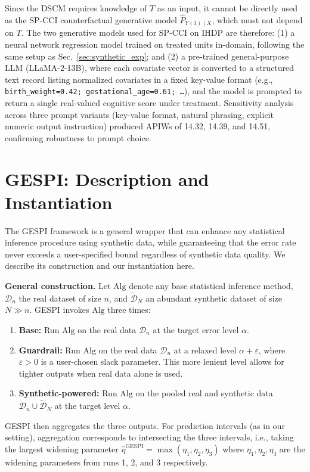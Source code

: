 \documentclass{article}
\theoremstyle{plain}
\theoremstyle{definition}
\theoremstyle{remark}
\begin{document}
Since the DSCM requires knowledge of $T$ as an input, it cannot be directly used as the SP-CCI counterfactual generative model $\hat{P}_{Y(1)\mid X}$, which must not depend on $T$. The two generative models used for SP-CCI on IHDP are therefore: (1) a neural network regression model trained on treated units in-domain, following the same setup as Sec.~\ref{sec:synthetic_exp}; and (2) a pre-trained general-purpose LLM (LLaMA-2-13B), where each covariate vector is converted to a structured text record listing normalized covariates in a fixed key-value format (e.g., \texttt{birth\_weight=0.42; gestational\_age=0.61; \ldots}), and the model is prompted to return a single real-valued cognitive score under treatment. Sensitivity analysis across three prompt variants (key-value format, natural phrasing, explicit numeric output instruction) produced APIWs of 14.32, 14.39, and 14.51, confirming robustness to prompt choice.


\section{GESPI: Description and Instantiation}
\label{appendix:gespi}

The GESPI framework \citep{bashari2026statistical} is a general wrapper that can enhance any statistical inference procedure using synthetic data, while guaranteeing that the error rate never exceeds a user-specified bound regardless of synthetic data quality. We describe its construction and our instantiation here.

\textbf{General construction.} Let $\mathrm{Alg}$ denote any base statistical inference method, $\mathcal{D}_n$ the real dataset of size $n$, and $\tilde{\mathcal{D}}_N$ an abundant synthetic dataset of size $N \gg n$. GESPI invokes $\mathrm{Alg}$ three times:
\begin{enumerate}
    \item \textbf{Base:} Run $\mathrm{Alg}$ on the real data $\mathcal{D}_n$ at the target error level $\alpha$.
    \item \textbf{Guardrail:} Run $\mathrm{Alg}$ on the real data $\mathcal{D}_n$ at a relaxed level $\alpha + \varepsilon$, where $\varepsilon > 0$ is a user-chosen slack parameter. This more lenient level allows for tighter outputs when real data alone is used.
    \item \textbf{Synthetic-powered:} Run $\mathrm{Alg}$ on the pooled real and synthetic data $\mathcal{D}_n \cup \tilde{\mathcal{D}}_N$ at the target level $\alpha$.
\end{enumerate}
GESPI then aggregates the three outputs. For prediction intervals (as in our setting), aggregation corresponds to intersecting the three intervals, i.e., taking the largest widening parameter $\hat{\eta}^{\text{GESPI}} = \max(\eta_1, \eta_2, \eta_3)$ where $\eta_1, \eta_2, \eta_3$ are the widening parameters from runs 1, 2, and 3 respectively.
\end{document}
